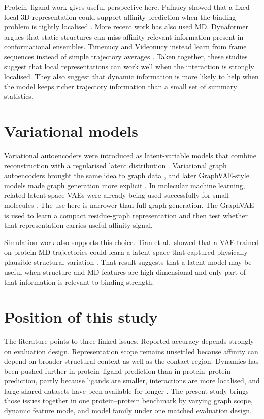 Protein--ligand work gives useful perspective here. Pafnucy showed that a fixed local 3D representation could support affinity prediction when the binding problem is tightly localised \citep{Stepniewska2018Pafnucy}. More recent work has also used MD. Dynaformer argues that static structures can miss affinity-relevant information present in conformational ensembles. Timenucy and Videonucy instead learn from frame sequences instead of simple trajectory averages \citep{Min2024Dynaformer,Libouban2025Spatiotemporal}. Taken together, these studies suggest that local representations can work well when the interaction is strongly localised. They also suggest that dynamic information is more likely to help when the model keeps richer trajectory information than a small set of summary statistics.

\section{Variational models}

Variational autoencoders were introduced as latent-variable models that combine reconstruction with a regularised latent distribution \citep{Kingma2014VAE}. Variational graph autoencoders brought the same idea to graph data \citep{Kipf2016VGAE}, and later GraphVAE-style models made graph generation more explicit \citep{Simonovsky2018GraphVAE}. In molecular machine learning, related latent-space VAEs were already being used successfully for small molecules \citep{GomezBombarelli2018MolecularVAE}. The use here is narrower than full graph generation. The GraphVAE is used to learn a compact residue-graph representation and then test whether that representation carries useful affinity signal.

Simulation work also supports this choice. Tian et al.\ showed that a VAE trained on protein MD trajectories could learn a latent space that captured physically plausible structural variation \citep{Tian2021ProteinVAE}. That result suggests that a latent model may be useful when structure and MD features are high-dimensional and only part of that information is relevant to binding strength.

\section{Position of this study}

The literature points to three linked issues. Reported accuracy depends strongly on evaluation design. Representation scope remains unsettled because affinity can depend on broader structural context as well as the contact region. Dynamics has been pushed further in protein--ligand prediction than in protein--protein prediction, partly because ligands are smaller, interactions are more localised, and large shared datasets have been available for longer \citep{Wang2004PDBbind,Siebenmorgen2020PPIReview,Min2024Dynaformer,Libouban2025Spatiotemporal}. The present study brings those issues together in one protein--protein benchmark by varying graph scope, dynamic feature mode, and model family under one matched evaluation design.
